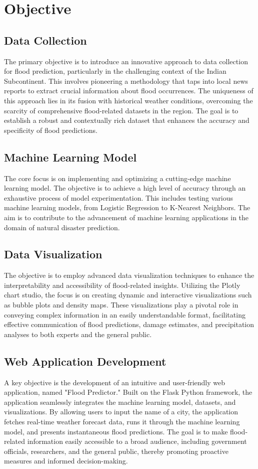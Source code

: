 \documentclass[a4paper,12pt]{report}
\begin{document}
\chapter{Objective}

\section{Data Collection}
The primary objective is to introduce an innovative approach to data collection for flood prediction, particularly in the challenging context of the Indian Subcontinent. This involves pioneering a methodology that taps into local news reports to extract crucial information about flood occurrences. The uniqueness of this approach lies in its fusion with historical weather conditions, overcoming the scarcity of comprehensive flood-related datasets in the region. The goal is to establish a robust and contextually rich dataset that enhances the accuracy and specificity of flood predictions.

\section{Machine Learning Model}
The core focus is on implementing and optimizing a cutting-edge machine learning model. The objective is to achieve a high level of accuracy through an exhaustive process of model experimentation. This includes testing various machine learning models, from Logistic Regression to K-Nearest Neighbors. The aim is to contribute to the advancement of machine learning applications in the domain of natural disaster prediction.

\section{Data Visualization}
The objective is to employ advanced data visualization techniques to enhance the interpretability and accessibility of flood-related insights. Utilizing the Plotly chart studio, the focus is on creating dynamic and interactive visualizations such as bubble plots and density maps. These visualizations play a pivotal role in conveying complex information in an easily understandable format, facilitating effective communication of flood predictions, damage estimates, and precipitation analyses to both experts and the general public.

\section{Web Application Development} 
A key objective is the development of an intuitive and user-friendly web application, named "Flood Predictor." Built on the Flask Python framework, the application seamlessly integrates the machine learning model, datasets, and visualizations. By allowing users to input the name of a city, the application fetches real-time weather forecast data, runs it through the machine learning model, and presents instantaneous flood predictions. The goal is to make flood-related information easily accessible to a broad audience, including government officials, researchers, and the general public, thereby promoting proactive measures and informed decision-making.
\end{document}
